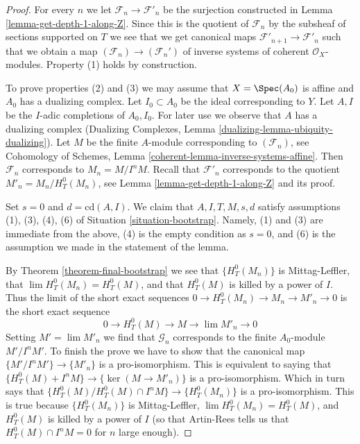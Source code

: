 \begin{proof}
For every $n$ we let $\mathcal{F}_n \to \mathcal{F}'_n$ be the surjection
constructed in Lemma \ref{lemma-get-depth-1-along-Z}.
Since this is the quotient of $\mathcal{F}_n$ by the subsheaf
of sections supported on $T$ we see that we get canonical maps
$\mathcal{F}'_{n + 1} \to \mathcal{F}'_n$ such that we obtain
a map $(\mathcal{F}_n) \to (\mathcal{F}_n')$
of inverse systems of coherent $\mathcal{O}_X$-modules.
Property (1) holds by construction.

\medskip\noindent
To prove properties (2) and (3) we may assume that $X = \Spec(A_0)$ is
affine and $A_0$ has a dualizing complex. Let $I_0 \subset A_0$ be the
ideal corresponding to $Y$. Let $A, I$ be the $I$-adic completions of
$A_0, I_0$. For later use we observe that $A$ has a dualizing complex
(Dualizing Complexes, Lemma \ref{dualizing-lemma-ubiquity-dualizing}).
Let $M$ be the finite $A$-module corresponding to $(\mathcal{F}_n)$, see
Cohomology of Schemes, Lemma \ref{coherent-lemma-inverse-systems-affine}.
Then $\mathcal{F}_n$ corresponds to $M_n = M/I^nM$. Recall that
$\mathcal{F}'_n$ corresponds to the quotient $M'_n = M_n / H^0_T(M_n)$,
see Lemma \ref{lemma-get-depth-1-along-Z} and its proof.

\medskip\noindent
Set $s = 0$ and $d = \text{cd}(A, I)$.
We claim that $A, I, T, M, s, d$ satisfy assumptions (1), (3), (4), (6)
of Situation \ref{situation-bootstrap}.
Namely, (1) and (3) are immediate from the above, (4) is
the empty condition as $s = 0$, and (6) is the assumption
we made in the statement of the lemma.

\medskip\noindent
By Theorem \ref{theorem-final-bootstrap} we see that $\{H^0_T(M_n)\}$
is Mittag-Leffler, that $\lim H^0_T(M_n) = H^0_T(M)$, and that
$H^0_T(M)$ is killed by a power of $I$. Thus the
limit of the short exact sequences $0 \to H^0_T(M_n) \to M_n \to M'_n \to 0$
is the short exact sequence
$$
0 \to H^0_T(M) \to M \to \lim M'_n \to 0
$$
Setting $M' = \lim M'_n$ we find that $\mathcal{G}_n$ corresponds to
the finite $A_0$-module $M'/I^nM'$. To finish the prove we have to show
that the canonical map $\{M'/I^nM'\} \to \{M'_n\}$ is a pro-isomorphism.
This is equivalent to saying that
$\{H^0_T(M) + I^nM\} \to \{\ker(M \to M'_n)\}$ is a
pro-isomorphism. Which in turn says that
$\{H^0_T(M)/H^0_T(M) \cap I^nM\} \to \{H^0_T(M_n)\}$
is a pro-isomorphism. This is true because $\{H^0_T(M_n)\}$
is Mittag-Leffler, $\lim H^0_T(M_n) = H^0_T(M)$, and
$H^0_T(M)$ is killed by a power of $I$ (so that Artin-Rees
tells us that $H^0_T(M) \cap I^nM = 0$ for $n$ large enough).
\end{proof}

